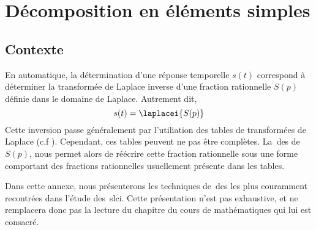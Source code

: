 \chapter{Décomposition en éléments simples\label{annexe-DES}}

\section{Contexte}
En automatique, la détermination d'une réponse temporelle $s(t)$
correspond à déterminer la transformée 
de Laplace inverse d'une fraction rationnelle $S(p)$ 
définie dans le domaine de Laplace. Autrement dit, 
$$
s(t)=\laplacei{S(p)}
$$
Cette inversion passe généralement par l'utiliation des tables de 
transformées de Laplace (c.f ).
Cependant, ces tables peuvent ne pas être complètes. La~\gls{des} de $S(p)$, 
nous permet alors de réécrire cette fraction rationnelle sous une forme 
comportant des fractions rationnelles usuellement présente dans les tables.

Dans cette annexe, nous présenterons les techniques de~\gls{des} les plus 
couramment recontrées dans l'étude des~\gls{slci}. 
Cette présentation n'est pas exhaustive, et ne remplacera donc 
pas la lecture du chapitre du cours de mathématiques qui lui est consacré.

